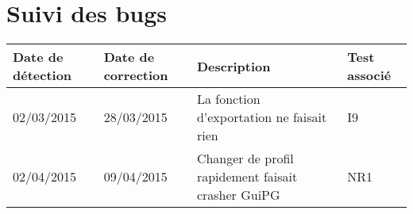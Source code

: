 \documentclass{../res/univ-projet}
\begin{document}
\section{Suivi des bugs}

\begin{center}
    \begin{tabular}{|p{1.9cm}|p{1.9cm}|p{9cm}|p{1.9cm}|}
      \hline
      Date de détection & Date de correction & Description & Test associé\\ \hline
      02/03/2015 & 28/03/2015 & La fonction d'exportation ne faisait rien & I9\\ \hline
      02/04/2015 & 09/04/2015 & Changer de profil rapidement faisait crasher GuiPG & NR1\\ \hline
  \end{tabular}  
\end{center}
\end{document}
